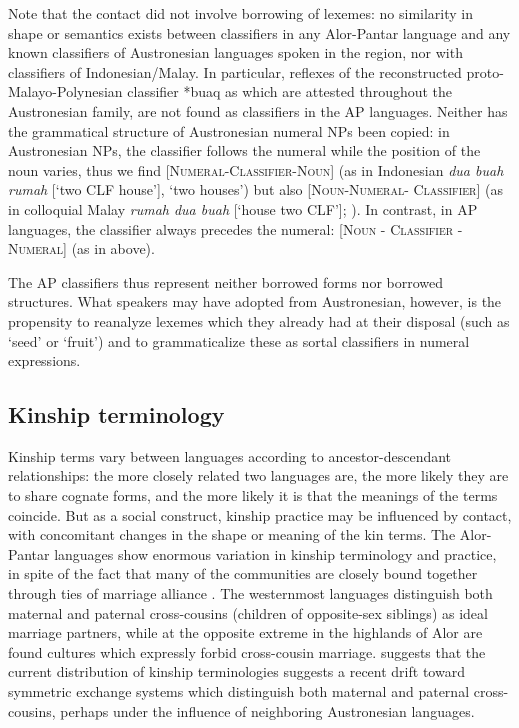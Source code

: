 {Note that the contact did not involve borrowing of lexemes: no similarity in shape or semantics exists between classifiers in any Alor-Pantar language and any known classifiers of Austronesian languages spoken in the region, nor with classifiers of Indonesian/Malay. In particular, reflexes of the reconstructed proto-Malayo-Polynesian classifier *buaq as which are attested throughout the Austronesian family, are not found as classifiers in the AP languages. Neither has the grammatical structure of Austronesian numeral NPs been copied: in Austronesian NPs, the classifier follows the numeral while the position of the noun varies, thus we find [\textsc{Numeral-Classifier-Noun}] (as in Indonesian \textit{dua buah rumah} [`two CLF house'], `two houses') but also \textsc{[Noun-Numeral- Classifier]} (as in colloquial Malay \textit{rumah dua buah} [`house two CLF']; \citealt[283-284]{Blust2009}). In contrast, in AP languages, the classifier always precedes the numeral: \textsc{[Noun - Classifier - Numeral]} (as in  above).

The AP classifiers thus represent neither borrowed forms nor borrowed structures. What speakers may have adopted from Austronesian, however, is the propensity to reanalyze lexemes which they already had at their disposal (such as `seed' or `fruit') and to grammaticalize these as sortal classifiers in numeral expressions. 

\subsection{Kinship terminology}\label{sec:1:6.4}
Kinship terms vary between languages according to ancestor-descendant relationships: the more closely related two languages are, the more likely they are to share cognate forms, and the more likely it is that the meanings of the terms coincide. But as a social construct, kinship practice may be influenced by contact, with concomitant changes in the shape or meaning of the kin terms. The Alor-Pantar languages show enormous variation in kinship terminology and practice, in spite of the fact that many of the communities are closely bound together through ties of marriage alliance \citep{HoltonTV}. The westernmost languages distinguish both maternal and paternal cross-cousins (children of opposite-sex siblings) as ideal marriage partners, while at the opposite extreme in the highlands of Alor are found cultures which expressly forbid cross-cousin marriage.  \citet{HoltonTV} suggests that the current distribution of kinship terminologies suggests a recent drift toward symmetric exchange systems which distinguish both maternal and paternal cross-cousins, perhaps under the influence of neighboring Austronesian languages. 

}
